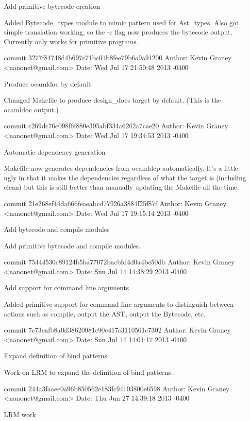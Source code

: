     Add primitive bytecode creation
    
    Added Bytecode_types module to mimic pattern used for Ast_types.
    Also got simple translation working, so the -c flag now produces
    the bytecode output.  Currently only works for primitive programs.

commit 3277f84748d4b697c71bc01b8fee79b6a9a91200
Author: Kevin Graney <nanonet@gmail.com>
Date:   Wed Jul 17 21:50:48 2013 -0400

    Produce ocamldoc by default
    
    Changed Makefile to produce design_docs target by default.  (This
    is the ocamldoc output.)

commit c269dc76c098f6f880e395abf334a6262a7cae20
Author: Kevin Graney <nanonet@gmail.com>
Date:   Wed Jul 17 19:34:53 2013 -0400

    Automatic dependency generation
    
    Makefile now generates dependencies from ocamldep automatically.  It's
    a little ugly in that it makes the dependencies regardless of what the
    target is (including clean) but this is still better than manually
    updating the Makefile all the time.

commit 21e268ef44da666feaeabcd77926a3884f25f87f
Author: Kevin Graney <nanonet@gmail.com>
Date:   Wed Jul 17 19:15:14 2013 -0400

    Add bytecode and compile modules
    
    Add primitive bytecode and compile modules.

commit 75444530c89124b5ba77072bacbfd4d0a4be50db
Author: Kevin Graney <nanonet@gmail.com>
Date:   Sun Jul 14 14:38:29 2013 -0400

    Add support for command line arguments
    
    Added primitive support for command line arguments to distinguish
    between actions such as compile, output the AST, output the Bytecode,
    etc.

commit 7c73eafb8a0d38620081c90e417c3110561c7302
Author: Kevin Graney <nanonet@gmail.com>
Date:   Sun Jul 14 14:01:17 2013 -0400

    Expand definition of bind patterns
    
    Work on LRM to expand the definition of bind patterns.

commit 244a3faaee0a96b850562e183fc94103800e6598
Author: Kevin Graney <nanonet@gmail.com>
Date:   Thu Jun 27 14:39:18 2013 -0400

    LRM work

